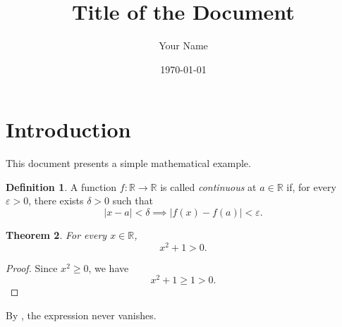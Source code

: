 \documentclass[11pt,a4paper]{article}
\title{Title of the Document}
\author{Your Name}
\date{\today}
\theoremstyle{plain}
\newtheorem{theorem}{Theorem}[section]
\theoremstyle{definition}
\newtheorem{definition}[theorem]{Definition}
\theoremstyle{remark}
\newcommand{\RR}{\mathbb{R}}
\newcommand{\abs}[1]{\left\lvert #1 \right\rvert}
\begin{document}
\maketitle
\tableofcontents

\section{Introduction}

This document presents a simple mathematical example.

\begin{definition}
A function \(f\colon \RR \to \RR\) is called \emph{continuous} at
\(a \in \RR\) if, for every \(\varepsilon > 0\), there exists
\(\delta > 0\) such that
\[
  \abs{x-a}<\delta
  \implies
  \abs{f(x)-f(a)}<\varepsilon.
\]
\end{definition}

\begin{theorem}\label{thm:example}
For every \(x \in \RR\),
\[
  x^2 + 1 > 0.
\]
\end{theorem}

\begin{proof}
Since \(x^2 \geq 0\), we have
\[
  x^2+1 \geq 1 > 0.
\]
\end{proof}

By , the expression never vanishes.
\end{document}
